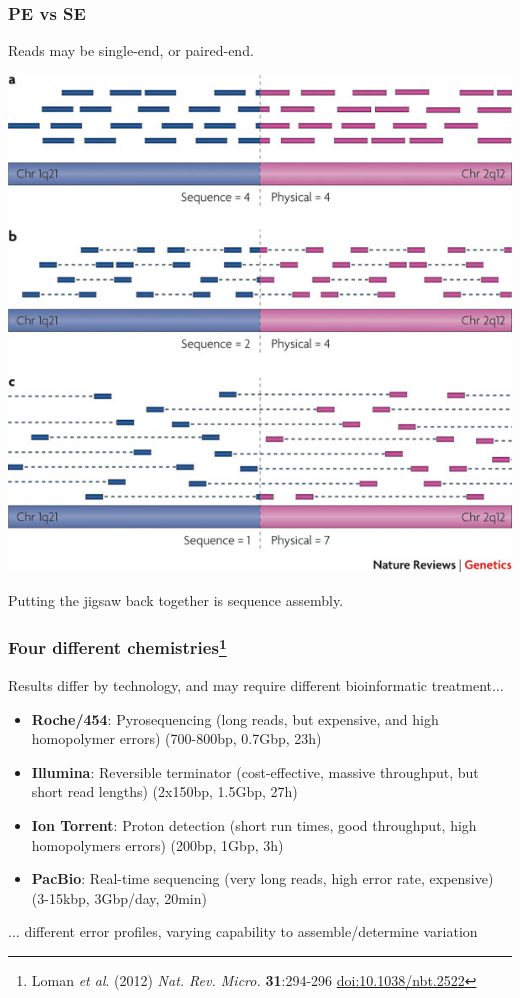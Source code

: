 \begin{frame}
  \frametitle{PE vs SE}
  Reads may be single-end, or paired-end.
  \begin{center}
    \includegraphics[height=0.6\textheight]{images/pe_vs_se}
  \end{center}      
  Putting the jigsaw back together is sequence assembly.
\end{frame}

\begin{frame}
  \frametitle{Four different chemistries\footnote{\tiny{Loman \textit{et al}. (2012) \textit{Nat. Rev. Micro.} \textbf{31}:294-296 \href{http://dx.doi.org/10.1038/nbt.2522}{doi:10.1038/nbt.2522}}}}
  Results differ by technology, and may require different bioinformatic treatment$\ldots$
  \begin{itemize}
    \item \textbf{Roche/454}: Pyrosequencing (long reads, but expensive, and high homopolymer errors) (700-800bp, 0.7Gbp, 23h)
    \item \textbf{Illumina}: Reversible terminator (cost-effective, massive throughput, but short read lengths) (2x150bp, 1.5Gbp, 27h)
    \item \textbf{Ion Torrent}: Proton detection (short run times, good throughput, high homopolymers errors) (200bp, 1Gbp, 3h)
    \item \textbf{PacBio}: Real-time sequencing (very long reads, high error rate, expensive) (3-15kbp, 3Gbp/day, 20min)
  \end{itemize}
  $\ldots$ different error profiles, varying capability to assemble/determine variation
\end{frame}

